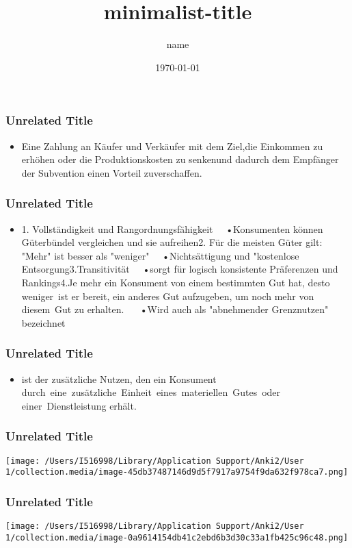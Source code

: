 \documentclass[aspectratio=169]{beamer}
\title{minimalist-title}
\author{name}
\date{\today}
\begin{document}
\begin{frame}
\frametitle{Unrelated Title}


\begin{itemize}
\item Eine Zahlung an Käufer und Verkäufer mit dem Ziel,die Einkommen zu erhöhen oder die Produktionskosten zu senkenund dadurch dem Empfänger der Subvention einen Vorteil zuverschaffen.
\end{itemize}

\note[item]{}
\end{frame}
\begin{frame}
\frametitle{Unrelated Title}


\begin{itemize}
\item 1. Vollständigkeit und Rangordnungsfähigkeit   •Konsumenten können Güterbündel vergleichen und sie aufreihen2. Für die meisten Güter gilt: "Mehr" ist besser als "weniger"   •Nichtsättigung und "kostenlose Entsorgung3.Transitivität   •sorgt für logisch konsistente Präferenzen und Rankings4.Je mehr ein Konsument von einem bestimmten Gut hat, desto weniger ist er bereit, ein anderes Gut aufzugeben, um noch mehr von diesem Gut zu erhalten.    •Wird auch als "abnehmender Grenznutzen" bezeichnet
\end{itemize}

\note[item]{}
\end{frame}
\begin{frame}
\frametitle{Unrelated Title}


\begin{itemize}
\item ist der zusätzliche Nutzen, den ein Konsument durch eine zusätzliche Einheit eines materiellen Gutes oder einer Dienstleistung erhält.
\end{itemize}

\note[item]{}
\end{frame}
\begin{frame}
\frametitle{Unrelated Title}

\begin{center}
\texttt{[image: /Users/I516998/Library/Application Support/Anki2/User 1/collection.media/image-45db37487146d9d5f7917a9754f9da632f978ca7.png]}
\end{center}


\note[item]{}
\end{frame}
\begin{frame}
\frametitle{Unrelated Title}

\begin{center}
\texttt{[image: /Users/I516998/Library/Application Support/Anki2/User 1/collection.media/image-0a9614154db41c2ebd6b3d30c33a1fb425c96c48.png]}
\end{center}


\note[item]{}
\end{frame}
\end{document}
